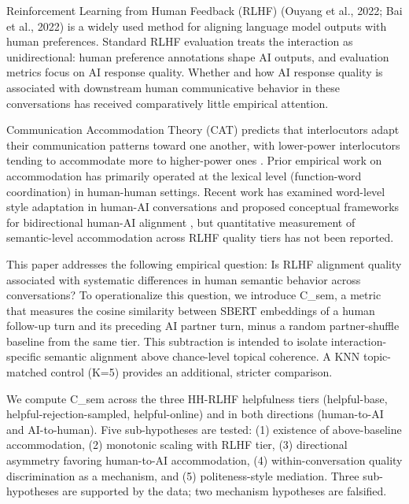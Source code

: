 
Reinforcement Learning from Human Feedback (RLHF) (Ouyang et al., 2022; Bai et al., 2022) is a widely used method for aligning language model outputs with human preferences. Standard RLHF evaluation treats the interaction as unidirectional: human preference annotations shape AI outputs, and evaluation metrics focus on AI response quality. Whether and how AI response quality is associated with downstream human communicative behavior in these conversations has received comparatively little empirical attention.

Communication Accommodation Theory (CAT) \citep{Giles1973Accent} predicts that interlocutors adapt their communication patterns toward one another, with lower-power interlocutors tending to accommodate more to higher-power ones \citep{DanescuNiculescuMizil2012Echoes}. Prior empirical work on accommodation has primarily operated at the lexical level (function-word coordination) in human-human settings. Recent work has examined word-level style adaptation in human-AI conversations \citep{Chang2025Language} and proposed conceptual frameworks for bidirectional human-AI alignment \citep{Shen2025Human}, but quantitative measurement of semantic-level accommodation across RLHF quality tiers has not been reported.

This paper addresses the following empirical question: Is RLHF alignment quality associated with systematic differences in human semantic behavior across conversations? To operationalize this question, we introduce C\_sem, a metric that measures the cosine similarity between SBERT embeddings of a human follow-up turn and its preceding AI partner turn, minus a random partner-shuffle baseline from the same tier. This subtraction is intended to isolate interaction-specific semantic alignment above chance-level topical coherence. A KNN topic-matched control (K=5) provides an additional, stricter comparison.

We compute C\_sem across the three HH-RLHF helpfulness tiers (helpful-base, helpful-rejection-sampled, helpful-online) and in both directions (human-to-AI and AI-to-human). Five sub-hypotheses are tested: (1) existence of above-baseline accommodation, (2) monotonic scaling with RLHF tier, (3) directional asymmetry favoring human-to-AI accommodation, (4) within-conversation quality discrimination as a mechanism, and (5) politeness-style mediation. Three sub-hypotheses are supported by the data; two mechanism hypotheses are falsified.

